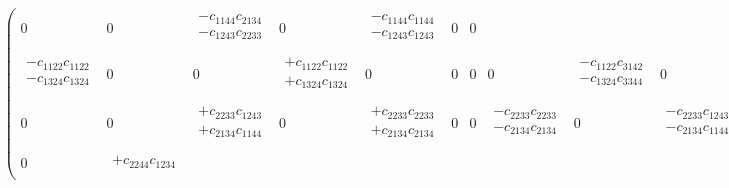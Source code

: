 \begin{eqnarray}
\begin{pmatrix}
0 &
0 &
\begin{array}{l}
-c_{1144}c_{2134} \\
-c_{1243}c_{2233} \\
\end{array} &
0 &
\begin{array}{l}
-c_{1144}c_{1144} \\
-c_{1243}c_{1243} \\
\end{array} &
0 &
0 \\
\begin{array}{l}
-c_{1122}c_{1122} \\
-c_{1324}c_{1324} \\
\end{array} &
0 &
0 &
\begin{array}{l}
+c_{1122}c_{1122} \\
+c_{1324}c_{1324} \\
\end{array} &
0 &
0 &
0 &
0 &
\begin{array}{l}
-c_{1122}c_{3142} \\
-c_{1324}c_{3344} \\
\end{array} &
0 &
0 &
\begin{array}{l}
+c_{1122}c_{3142} \\
+c_{1324}c_{3344} \\
\end{array} \\
0 &
0 &
\begin{array}{l}
+c_{2233}c_{1243} \\
+c_{2134}c_{1144} \\
\end{array} &
0 &
\begin{array}{l}
+c_{2233}c_{2233} \\
+c_{2134}c_{2134} \\
\end{array} &
0 &
0 &
\begin{array}{l}
-c_{2233}c_{2233} \\
-c_{2134}c_{2134} \\
\end{array} &
0 &
\begin{array}{l}
-c_{2233}c_{1243} \\
-c_{2134}c_{1144} \\
\end{array} &
0 &
0 \\
0 &
\begin{array}{l}
+c_{2244}c_{1234} \\

\end{array}
\end{pmatrix}
\end{eqnarray}
